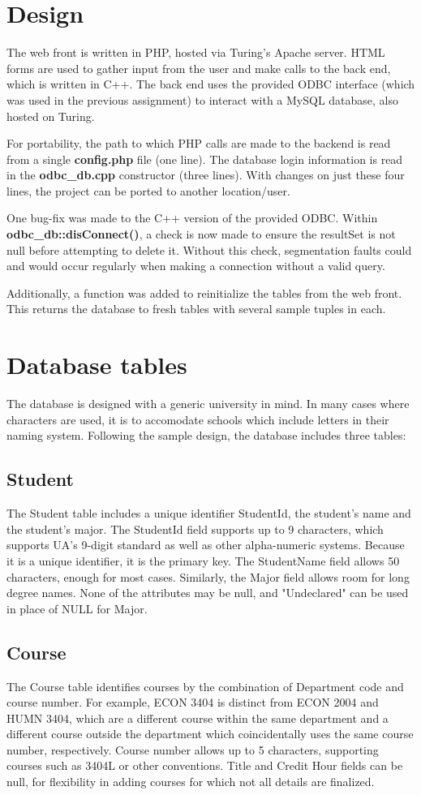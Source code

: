 \documentclass{article}      %
\begin{document}
\section*{Design}
The web front is written in PHP, hosted via Turing's Apache server.
HTML forms are used to gather input from the user and make calls to the back end,
which is written in C++.
The back end uses the provided ODBC interface (which was used in the previous assignment)
to interact with a MySQL database, also hosted on Turing.

For portability, the path to which PHP calls are made to the backend is read from a single
\textbf{config.php} file (one line).
The database login information is read in the \textbf{odbc\_db.cpp} constructor (three lines).
With changes on just these four lines, the project can be ported to another location/user.

One bug-fix was made to the C++ version of the provided ODBC.
Within \textbf{odbc\_db::disConnect()}, a check is now made to ensure the resultSet
is not null before attempting to delete it.
Without this check, segmentation faults could and would occur regularly when making a 
connection without a valid query.

Additionally, a function was added to reinitialize the tables from the web front.
This returns the database to fresh tables with several sample tuples in each.

\section*{Database tables}
The database is designed with a generic university in mind.
In many cases where characters are used, it is to accomodate schools which
include letters in their naming system.
Following the sample design, the database includes three tables:
\subsection*{Student}
The Student table includes a unique identifier StudentId,
the student's name and the student's major.
The StudentId field supports up to 9 characters, which supports UA's 9-digit standard
as well as other alpha-numeric systems.
Because it is a unique identifier, it is the primary key.
The StudentName field allows 50 characters, enough for most cases.
Similarly, the Major field allows room for long degree names.
None of the attributes may be null, and "Undeclared" can be used in place of NULL for Major.
\subsection*{Course}
The Course table identifies courses by the combination of Department code and course number.
For example, ECON 3404 is distinct from ECON 2004 and HUMN 3404,
which are a different course within the same department and a different course outside the
department which coincidentally uses the same course number, respectively.
Course number allows up to 5 characters, supporting courses such as 3404L or other conventions.
Title and Credit Hour fields can be null, for flexibility in adding courses for which
not all details are finalized.
\end{document}
